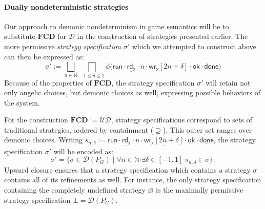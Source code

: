 \documentclass[draft,11pt]{report}
\newcommand{\kw}[1]{\ensuremath{ \mathsf{#1} }}
\newcommand{\bdot}{\boldsymbol{\cdot}}
\begin{document}

\paragraph{Dually nondeterministic strategies} %

Our approach to demonic nondeterminism in game semantics
will be to substitute $\mathbf{FCD}$ for $\mathcal{D}$
in the construction of strategies presented earlier. 
The more permissive \emph{strategy specification} $\sigma'$
which we attempted to construct above
can then be expressed as:
\[
  \sigma' :=
    \bigsqcup_{n \in \mathbb{N}}
    \bigsqcap_{-1 \le \delta \le 1}
    \phi \big(
        \kw{run} \cdot
        \underline{\kw{rd}_\kw{x}} \cdot n \cdot
        \underline{\kw{wr}_\kw{x}[2n + \delta]} \cdot \kw{ok} \cdot
        \underline{\kw{done}} \big)
\]
Because of the properties of $\mathbf{FCD}$,
the strategy specification $\sigma'$ will retain
not only angelic choices,
but demonic choices as well,
expressing possible behaviors
of the system.

For the construction $\mathbf{FCD} := \mathcal{U} \mathcal{D}$,
strategy specifications correspond to
sets of traditional strategies,
ordered by containment ($\supseteq$).
This outer set ranges over demonic choices.
Writing
$
  s_{n,\delta} :=
        \kw{run} \cdot
        \underline{\kw{rd}_\kw{x}} \cdot n \cdot
        \underline{\kw{wr}_\kw{x}[2n + \delta]} \cdot \kw{ok} \cdot
        \underline{\kw{done}} %
$,
the strategy specification $\sigma'$
will be encoded as:
\[
  \sigma' =
  \{ \sigma \in \mathcal{D}(P_G) \mid
     \forall n \in \mathbb{N} \bdot
     \exists \delta \in [-1,1] \bdot
     s_{n,\delta} \in \sigma \} \,.
\]
Upward closure ensures that a strategy specification
which contains a strategy $\sigma$
contains all of its refinements as well.
For instance,
the only strategy specification
containing the completely undefined strategy $\varnothing$
is the maximally permissive strategy specification $\bot = \mathcal{D}(P_G)$.




%
%
\end{document}
